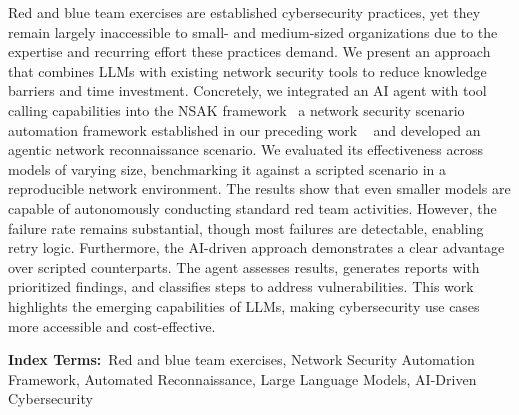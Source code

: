 
Red and blue team exercises are established cybersecurity practices,
yet they remain largely inaccessible to small- and medium-sized organizations due to the expertise and recurring effort these practices demand.
We present an approach that combines \glspl{LLM} with existing network security tools to reduce knowledge barriers and time investment.
Concretely, we integrated an \gls{AI} agent with tool calling capabilities into the \gls{NSAK} framework
\textthreequartersemdash~a network security scenario automation framework established in our preceding work \textthreequartersemdash~
and developed an agentic network reconnaissance scenario.
We evaluated its effectiveness across models of varying size,
benchmarking it against a scripted scenario in a reproducible network environment.
The results show that even smaller models are capable of autonomously conducting standard red team activities.
However, the failure rate remains substantial, though most failures are detectable, enabling retry logic.
Furthermore, the \gls{AI}-driven approach demonstrates a clear advantage over scripted counterparts.
The agent assesses results, generates reports with prioritized findings, and classifies steps to address vulnerabilities.
This work highlights the emerging capabilities of \glspl{LLM},
making cybersecurity use cases more accessible and cost-effective.

\textbf{Index Terms:}~Red and blue team exercises, Network Security Automation Framework, Automated Reconnaissance, Large Language Models, \gls{AI}-Driven Cybersecurity
